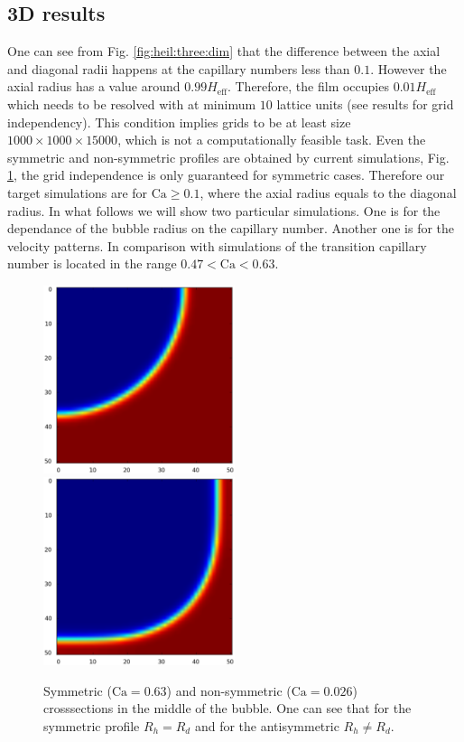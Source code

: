 \documentclass{CFD2011}
\newcommand{\Ca}{\mathrm{Ca}}
\begin{document}
\subsection{3D results}
One can see from Fig. \ref{fig:heil:three:dim} that the difference between the axial and diagonal
radii
happens at the capillary numbers less than $0.1$. However the axial radius has a value around $0.99
H_{\mathrm{eff}}$. Therefore, the film occupies $0.01 H_{\mathrm{eff}}$ which needs to be resolved
with at minimum $10$ lattice units (see results for grid independency). This condition implies grids
to be at least size $1000\times1000\times 15000$, which is not a computationally feasible
task. Even the symmetric and non-symmetric profiles are obtained by current simulations, Fig.
\ref{fig:sym:antisym}, the grid independence is only guaranteed for symmetric cases.
Therefore our target simulations are for $\Ca\geq 0.1$, where the axial radius equals to the
diagonal radius. In what follows we will show two particular simulations. One is for the dependance
of the bubble radius on the capillary number. Another one is for the velocity patterns. In
comparison with simulations of \citet{heil-threedim} the transition capillary
number is located in the range $0.47<\Ca<0.63$. 
\begin{figure}[ht]
\includegraphics[width=0.5\textwidth]{Figures/sym.eps}\\
\includegraphics[width=0.5\textwidth]{Figures/antisym.eps}\\
\caption{Symmetric ($\Ca=0.63$) and non-symmetric ($\Ca=0.026$) crosssections in the middle of the
bubble. One can see that for the symmetric profile $R_h=R_d$ and for the antisymmetric $R_h\neq
R_d$.  \label{fig:sym:antisym} }
\end{figure}
 
\end{document}
